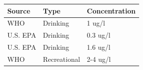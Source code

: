 \documentclass[11pt,]{article}
\begin{document}
\begin{longtable}[c]{@{}lll@{}}
\toprule
\begin{minipage}[b]{0.11\columnwidth}\raggedright\strut
Source
\strut\end{minipage} &
\begin{minipage}[b]{0.16\columnwidth}\raggedright\strut
Type
\strut\end{minipage} &
\begin{minipage}[b]{0.19\columnwidth}\raggedright\strut
Concentration
\strut\end{minipage}\tabularnewline
\midrule
\endhead
\begin{minipage}[t]{0.11\columnwidth}\raggedright\strut
WHO
\strut\end{minipage} &
\begin{minipage}[t]{0.16\columnwidth}\raggedright\strut
Drinking
\strut\end{minipage} &
\begin{minipage}[t]{0.19\columnwidth}\raggedright\strut
1 ug/l
\strut\end{minipage}\tabularnewline
\begin{minipage}[t]{0.11\columnwidth}\raggedright\strut
U.S. EPA
\strut\end{minipage} &
\begin{minipage}[t]{0.16\columnwidth}\raggedright\strut
Drinking
\strut\end{minipage} &
\begin{minipage}[t]{0.19\columnwidth}\raggedright\strut
0.3 ug/l
\strut\end{minipage}\tabularnewline
\begin{minipage}[t]{0.11\columnwidth}\raggedright\strut
U.S. EPA
\strut\end{minipage} &
\begin{minipage}[t]{0.16\columnwidth}\raggedright\strut
Drinking
\strut\end{minipage} &
\begin{minipage}[t]{0.19\columnwidth}\raggedright\strut
1.6 ug/l
\strut\end{minipage}\tabularnewline
\begin{minipage}[t]{0.11\columnwidth}\raggedright\strut
WHO
\strut\end{minipage} &
\begin{minipage}[t]{0.16\columnwidth}\raggedright\strut
Recreational
\strut\end{minipage} &
\begin{minipage}[t]{0.19\columnwidth}\raggedright\strut
2-4 ug/l
\strut\end{minipage}\tabularnewline

\end{longtable}
\end{document}
